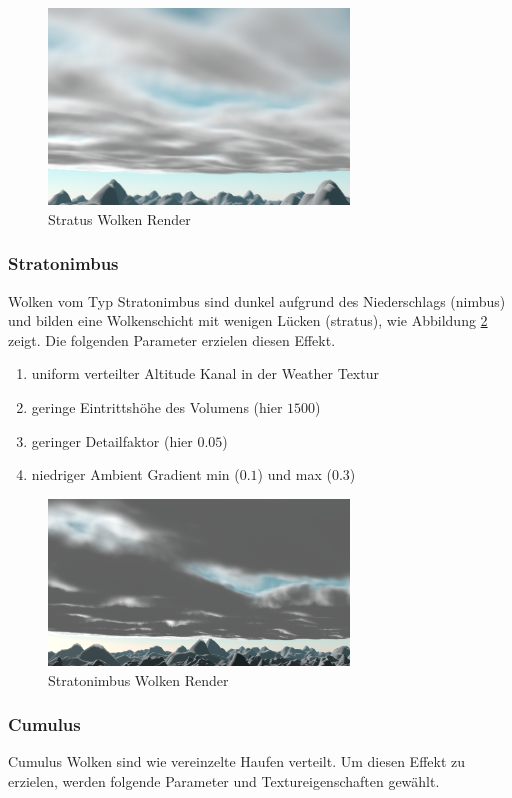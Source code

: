 \begin{figure}[H]
    \centering
    \includegraphics[width=8cm]{figures/stratus.png}
    \caption{Stratus Wolken Render}
    \label{fig:stratus}
\end{figure}

\subsubsection{Stratonimbus}
Wolken vom Typ Stratonimbus sind dunkel aufgrund des Niederschlags (nimbus) und bilden eine Wolkenschicht mit wenigen Lücken (stratus), wie Abbildung \ref{fig:stratonimbus} zeigt. Die folgenden Parameter erzielen diesen Effekt.

\begin{enumerate}
    \item uniform verteilter Altitude Kanal in der Weather Textur
    \item geringe Eintrittshöhe des Volumens (hier $ 1500 $)
    \item geringer Detailfaktor (hier $ 0.05 $)
    \item niedriger Ambient Gradient min ($ 0.1 $) und max ($ 0.3 $)
\end{enumerate}

\begin{figure}[H]
    \centering
    \includegraphics[width=8cm]{figures/stratonimbus.png}
    \caption{Stratonimbus Wolken Render}
    \label{fig:stratonimbus}
\end{figure}

\subsubsection{Cumulus}
Cumulus Wolken sind wie vereinzelte Haufen verteilt. Um diesen Effekt zu erzielen, werden folgende Parameter und Textureigenschaften gewählt.

